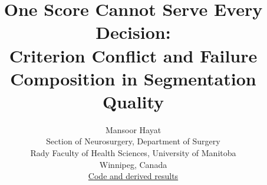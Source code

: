 \documentclass[10pt,twocolumn,letterpaper]{article}
\title{One Score Cannot Serve Every Decision:\\
Criterion Conflict and Failure Composition in Segmentation Quality}
\author{Mansoor Hayat\\
Section of Neurosurgery, Department of Surgery\\
Rady Faculty of Health Sciences, University of Manitoba\\
Winnipeg, Canada\\
\href{https://github.com/MansoorHayat777/segmentation-reliability-tradeoffs}{Code and derived results}}
\begin{document}











{\small


}
\end{document}
